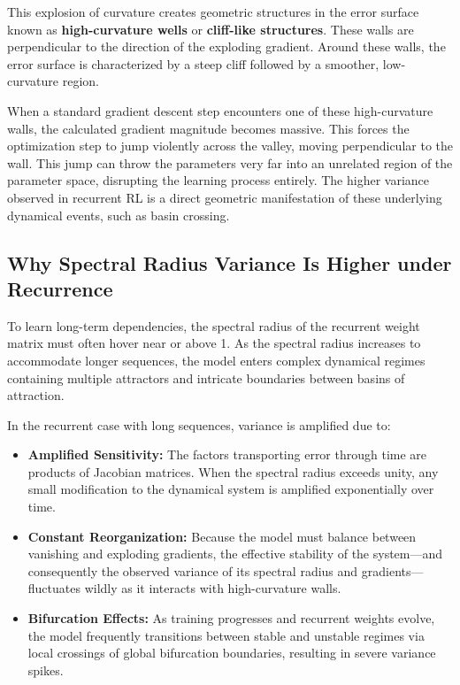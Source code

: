\documentclass[11pt,a4paper]{article}
\begin{document}
This explosion of curvature creates geometric structures in the error surface known as \textbf{high-curvature wells} or \textbf{cliff-like structures}. These walls are perpendicular to the direction of the exploding gradient. Around these walls, the error surface is characterized by a steep cliff followed by a smoother, low-curvature region.

When a standard gradient descent step encounters one of these high-curvature walls, the calculated gradient magnitude becomes massive. This forces the optimization step to jump violently across the valley, moving perpendicular to the wall. This jump can throw the parameters very far into an unrelated region of the parameter space, disrupting the learning process entirely. The higher variance observed in recurrent RL is a direct geometric manifestation of these underlying dynamical events, such as basin crossing.

\subsection{Why Spectral Radius Variance Is Higher under Recurrence}
To learn long-term dependencies, the spectral radius of the recurrent weight matrix must often hover near or above 1. As the spectral radius increases to accommodate longer sequences, the model enters complex dynamical regimes containing multiple attractors and intricate boundaries between basins of attraction.

In the recurrent case with long sequences, variance is amplified due to:
\begin{itemize}
    \item \textbf{Amplified Sensitivity:} The factors transporting error through time are products of Jacobian matrices. When the spectral radius exceeds unity, any small modification to the dynamical system is amplified exponentially over time.
    \item \textbf{Constant Reorganization:} Because the model must balance between vanishing and exploding gradients, the effective stability of the system---and consequently the observed variance of its spectral radius and gradients---fluctuates wildly as it interacts with high-curvature walls.
    \item \textbf{Bifurcation Effects:} As training progresses and recurrent weights evolve, the model frequently transitions between stable and unstable regimes via local crossings of global bifurcation boundaries, resulting in severe variance spikes.
\end{itemize}
\end{document}
